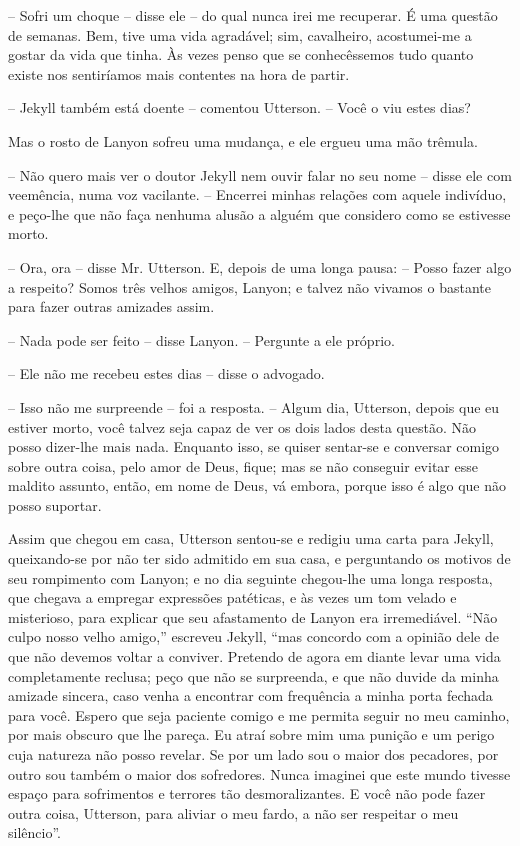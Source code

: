 -- Sofri um choque -- disse ele -- do qual nunca irei me recuperar.  É
uma questão de semanas.  Bem, tive uma vida agradável; sim, cavalheiro,
acostumei-me a gostar da vida que tinha.  Às vezes penso que se
conhecêssemos tudo quanto existe nos sentiríamos mais contentes na hora
de partir.

-- Jekyll também está doente -- comentou Utterson. -- Você o viu estes
dias?

Mas o rosto de Lanyon sofreu uma mudança, e ele ergueu uma mão trêmula.

-- Não quero mais ver o doutor Jekyll nem ouvir falar no seu nome --
disse ele com veemência, numa voz vacilante. -- Encerrei minhas relações
com aquele indivíduo, e peço-lhe que não faça nenhuma alusão a alguém
que considero como se estivesse morto.

-- Ora, ora -- disse Mr. Utterson.  E, depois de uma longa pausa: --
Posso fazer algo a respeito?  Somos três velhos amigos, Lanyon; e
talvez não vivamos o bastante para fazer outras amizades assim.

-- Nada pode ser feito -- disse Lanyon. -- Pergunte a ele próprio.

-- Ele não me recebeu estes dias -- disse o advogado.

-- Isso não me surpreende -- foi a resposta. -- Algum dia, Utterson,
depois que eu estiver morto, você talvez seja capaz de ver os dois lados desta
questão.  Não posso dizer-lhe mais nada.  Enquanto isso, se quiser
sentar-se e conversar comigo sobre outra coisa, pelo amor de Deus,
fique; mas se não conseguir evitar esse maldito assunto, então, em nome
de Deus, vá embora, porque isso é algo que não posso suportar.

Assim que chegou em casa, Utterson sentou-se e redigiu uma carta para
Jekyll, queixando-se por não ter sido admitido em sua casa, e
perguntando os motivos de seu rompimento com Lanyon; e no
dia seguinte chegou-lhe uma longa resposta, que chegava a empregar
expressões patéticas, e às vezes um tom velado e misterioso, para
explicar que seu afastamento de Lanyon era irremediável.  “Não culpo
nosso velho amigo,” escreveu Jekyll, “mas concordo com a opinião dele
de que não devemos voltar a conviver.  Pretendo de agora em diante
levar uma vida completamente reclusa; peço que não se surpreenda, e que
não duvide da minha amizade sincera, caso venha a encontrar com
frequência a minha porta fechada para você.  Espero que seja paciente
comigo e me permita seguir no meu caminho, por mais obscuro que lhe
pareça.  Eu atraí sobre mim uma punição e um perigo cuja natureza não
posso revelar.  Se por um lado sou o maior dos pecadores, por outro sou
também o maior dos sofredores.  Nunca imaginei que este mundo tivesse
espaço para sofrimentos e terrores tão desmoralizantes.  E você não
pode fazer outra coisa, Utterson, para aliviar o meu fardo, a não ser
respeitar o meu silêncio”.

